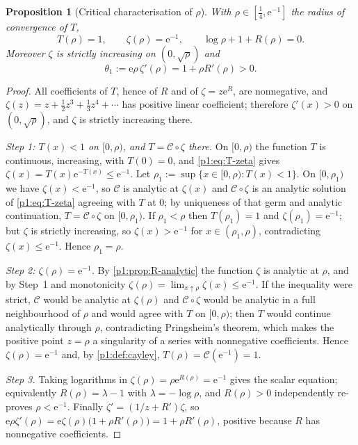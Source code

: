 \documentclass[11pt,a4paper,oneside]{book}
\theoremstyle{plain}
\newtheorem{proposition}[theorem]{Proposition}
\theoremstyle{definition}
\theoremstyle{remark}
\newcommand{\e}{\mathrm{e}}
\begin{document}
\begin{proposition}[Critical characterisation of $\rho$]
\label{p1:prop:critical}
With $\rho\in[\tfrac14,\e^{-1}]$ the radius of convergence of $T$,
\begin{equation}
 T(\rho)=1,\qquad \zeta(\rho)=\e^{-1},\qquad
 \log\rho+1+R(\rho)=0.
 \label{p1:eq:critical}
\end{equation}
Moreover $\zeta$ is strictly increasing on $(0,\sqrt\rho)$ and
\begin{equation}
 \theta_1:=\e\rho\,\zeta'(\rho)=1+\rho R'(\rho)>0 .
 \label{p1:eq:theta1}
\end{equation}
\end{proposition}

\begin{proof}
All coefficients of $T$, hence of $R$ and of $\zeta=z\e^{R}$, are nonnegative, and
$\zeta(z)=z+\tfrac12z^{3}+\tfrac13z^{4}+\cdots$ has positive linear coefficient; therefore
$\zeta'(x)>0$ on $(0,\sqrt\rho)$, and $\zeta$ is strictly increasing there.

\emph{Step 1: $T(x)<1$ on $[0,\rho)$, and $T=\mathcal C\circ\zeta$ there.}  On $[0,\rho)$ the
function $T$ is continuous, increasing, with $T(0)=0$, and \cref{p1:eq:T-zeta} gives
$\zeta(x)=T(x)\e^{-T(x)}\le\e^{-1}$.  Let $\rho_1:=\sup\{x\in[0,\rho):T(x)<1\}$.  On
$[0,\rho_1)$ we have $\zeta(x)<\e^{-1}$, so $\mathcal C$ is analytic at $\zeta(x)$ and
$\mathcal C\circ\zeta$ is an analytic solution of \cref{p1:eq:T-zeta} agreeing with $T$ at
$0$; by uniqueness of that germ and analytic continuation, $T=\mathcal C\circ\zeta$ on
$[0,\rho_1)$.  If $\rho_1<\rho$ then $T(\rho_1)=1$ and $\zeta(\rho_1)=\e^{-1}$; but $\zeta$ is
strictly increasing, so $\zeta(x)>\e^{-1}$ for $x\in(\rho_1,\rho)$, contradicting
$\zeta(x)\le\e^{-1}$.  Hence $\rho_1=\rho$.

\emph{Step 2: $\zeta(\rho)=\e^{-1}$.}  By \cref{p1:prop:R-analytic} the function $\zeta$ is
analytic at $\rho$, and by Step~1 and monotonicity $\zeta(\rho)=\lim_{x\uparrow\rho}
\zeta(x)\le\e^{-1}$.  If the inequality were strict, $\mathcal C$ would be analytic at
$\zeta(\rho)$ and $\mathcal C\circ\zeta$ would be analytic in a full neighbourhood of $\rho$
and would agree with $T$ on $[0,\rho)$; then $T$ would continue analytically through $\rho$,
contradicting Pringsheim's theorem, which makes the positive point $z=\rho$ a singularity of a
series with nonnegative coefficients.  Hence $\zeta(\rho)=\e^{-1}$ and, by
\cref{p1:def:cayley}, $T(\rho)=\mathcal C(\e^{-1})=1$.

\emph{Step 3.}  Taking logarithms in $\zeta(\rho)=\rho\e^{R(\rho)}=\e^{-1}$ gives the scalar
equation; equivalently $R(\rho)=\lambda-1$ with $\lambda=-\log\rho$, and $R(\rho)>0$
independently re-proves $\rho<\e^{-1}$.  Finally $\zeta'=(1/z+R')\zeta$, so
$\e\rho\zeta'(\rho)=\e\zeta(\rho)\bigl(1+\rho R'(\rho)\bigr)=1+\rho R'(\rho)$, positive
because $R$ has nonnegative coefficients.
\end{proof}
\end{document}
